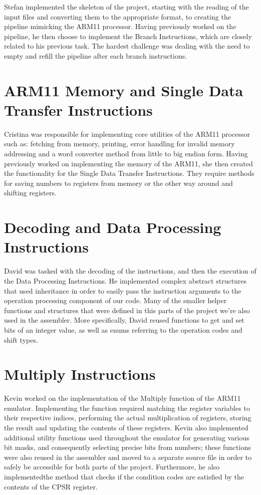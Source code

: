 \documentclass[11pt]{article}
\begin{document}
Stefan implemented the skeleton of the project, starting with the reading of the input files and converting them to the
appropriate format, to creating the pipeline mimicking the ARM11 processor. Having previously worked on the pipeline, he
then choose to implement the Branch Instructions, which are closely related to his previous task. The hardest challenge
was dealing with the need to empty and refill the pipeline after each branch instructions.

\section{ARM11 Memory and Single Data Transfer Instructions}

Cristina was responsible for implementing core utilities of the ARM11 processor such as: fetching from memory, printing,
error handling for invalid memory addressing and a word converter method from little to big endian form. Having previously
worked on implementing the memory of the ARM11, she then created the functionality for the Single Data Transfer Instructions.
They require methods for saving numbers to registers from memory or the other way around and shifting registers.

\section{Decoding and Data Processing Instructions}

David was tasked with the decoding of the instructions, and then the execution of the Data Processing Instructions. He implemented
complex abstract structures that used inheritance in order to easily pass the instruction arguments to the operation processing
component of our code. Many of the smaller helper functions and structures that were defined in this parts of the
project we're also used in the assembler. More specifically, David reused functions to get and set bits of an integer
value, as well as enums referring to the operation codes and shift types.

\section{Multiply Instructions}

Kevin worked on the implementation of the Multiply function of the ARM11 emulator. Implementing the function required
matching the register variables to their respective indices, performing the actual multiplication of registers,
storing the result and updating the contents of these registers. Kevin also implemented additional utility functions
used throughout the emulator for generating various bit masks, and consequently selecting precise bits from numbers; these
functions were also reused in the assembler and moved to a separate source file in order to safely be accessible for
both parts of the project. Furthermore, he also implementedthe method that checks if the condition codes are satisfied
by the contents of the CPSR register.
\end{document}
